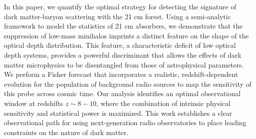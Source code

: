 \documentclass[]{article}
\begin{document}
In this paper, we quantify the optimal strategy for detecting the signature of dark matter-baryon scattering with the 21 cm forest. Using a semi-analytic framework to model the statistics of 21 cm absorbers, we demonstrate that the suppression of low-mass minihalos imprints a distinct feature on the shape of the optical depth distribution. This feature, a characteristic deficit of low optical depth systems, provides a powerful discriminant that allows the effects of dark matter microphysics to be disentangled from those of astrophysical parameters. We perform a Fisher forecast that incorporates a realistic, redshift-dependent evolution for the population of background radio sources to map the sensitivity of this probe across cosmic time. Our analysis identifies an optimal observational window at redshifts $z \sim 8-10$, where the combination of intrinsic physical sensitivity and statistical power is maximized. This work establishes a clear observational path for using next-generation radio observatories to place leading constraints on the nature of dark matter.
\end{document}
